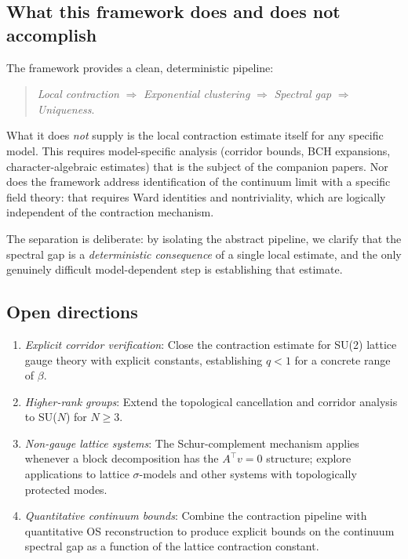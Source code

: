 \documentclass[11pt]{article}
\theoremstyle{definition}
\newcommand{\1}{\mathbf{1}}
\begin{document}
\subsection{What this framework does and does not accomplish}

The framework provides a clean, deterministic pipeline:
\begin{quote}
\emph{Local contraction} $\Longrightarrow$ \emph{Exponential clustering}
$\Longrightarrow$ \emph{Spectral gap} $\Longrightarrow$ \emph{Uniqueness}.
\end{quote}
What it does \emph{not} supply is the local contraction estimate itself for any specific
model.  This requires model-specific analysis (corridor bounds, BCH expansions,
character-algebraic estimates) that is the subject of the companion papers.  Nor does the
framework address identification of the continuum limit with a specific field theory:
that requires Ward identities and nontriviality, which are logically independent of the
contraction mechanism.

The separation is deliberate: by isolating the abstract pipeline, we clarify that
the spectral gap is a \emph{deterministic consequence} of a single local estimate,
and the only genuinely difficult model-dependent step is establishing that estimate.

\subsection{Open directions}

\begin{enumerate}[label=(\arabic*)]
\item \emph{Explicit corridor verification}: Close the contraction estimate for SU(2)
lattice gauge theory with explicit constants, establishing $q<1$ for a concrete range
of $\beta$.
\item \emph{Higher-rank groups}: Extend the topological cancellation and corridor analysis
to SU($N$) for $N\ge 3$.
\item \emph{Non-gauge lattice systems}: The Schur-complement mechanism applies whenever
a block decomposition has the $A^\top v=0$ structure; explore applications to lattice
$\sigma$-models and other systems with topologically protected modes.
\item \emph{Quantitative continuum bounds}: Combine the contraction pipeline with quantitative
OS reconstruction to produce explicit bounds on the continuum spectral gap as a function
of the lattice contraction constant.
\end{enumerate}
\end{document}
